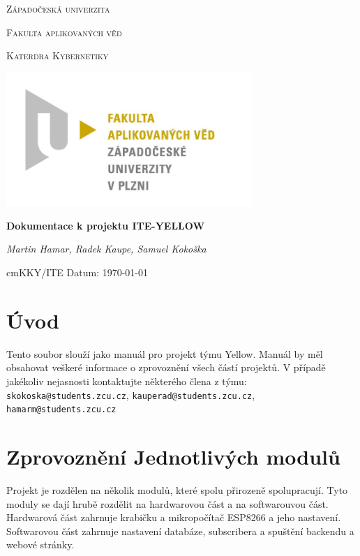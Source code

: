 \documentclass{article}
\begin{document}
\begin{titlepage}

	\centering

	{\scshape\LARGE Západočeská univerzita\par}
	{\scshape\Large Fakulta aplikovaných věd \par}
	{\scshape\Large Katerdra Kybernetiky \par}
	{\begin{center}
			\includegraphics[width=0.7\textwidth]{pic/fav.jpg}
		\end{center}}

	{\huge\bfseries Dokumentace k projektu ITE-YELLOW\par} %

	\vspace{2cm}

	{\Large\itshape Martin Hamar, Radek Kaupe, Samuel Kokoška\par}

	\vfill

	\vspace{1cm}

	 cm{KKY/ITE} \hfill {Datum: \today }



\end{titlepage}

\section{Úvod}
Tento soubor slouží jako manuál pro projekt týmu Yellow. Manuál by měl obsahovat veškeré informace o zprovoznění všech částí projektů. V případě jakékoliv nejasnosti kontaktujte některého člena z týmu: \texttt{skokoska@students.zcu.cz}, \texttt{kauperad@students.zcu.cz}, \texttt{hamarm@students.zcu.cz}

\section{Zprovoznění Jednotlivých modulů}
Projekt je rozdělen na několik modulů, které spolu přirozeně spolupracují. Tyto moduly se dají hrubě rozdělit na hardwarovou část a na softwarouvou část.
Hardwarová část zahrnuje krabičku a mikropočítač ESP8266 a jeho nastavení. Softwarovou část zahrnuje nastavení databáze, subscribera a spuštění backendu a webové stránky.
\end{document}
